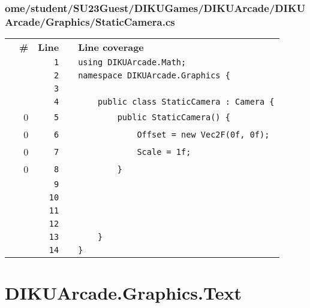 \documentclass[a4paper,landscape,10pt]{article}
\begin{document}
\subsubsection{ome/student/SU23Guest/DIKUGames/DIKUArcade/DIKUArcade/Graphics/StaticCamera.cs}
\begin{longtable}[l]{lrrll}
\textbf{} & \textbf{\#} & \textbf{Line} & \textbf{} & \textbf{Line coverage}\\
\cellcolor{gray} &  & \verb~1~ & & \verb~using DIKUArcade.Math;~\\
\cellcolor{gray} &  & \verb~2~ & & \verb~namespace DIKUArcade.Graphics {~\\
\cellcolor{gray} &  & \verb~3~ & & \verb~~\\
\cellcolor{gray} &  & \verb~4~ & & \verb~    public class StaticCamera : Camera {~\\
\cellcolor{red} & 0 & \verb~5~ & & \verb~        public StaticCamera() {~\\
\cellcolor{red} & 0 & \verb~6~ & & \verb~            Offset = new Vec2F(0f, 0f);~\\
\cellcolor{red} & 0 & \verb~7~ & & \verb~            Scale = 1f;~\\
\cellcolor{red} & 0 & \verb~8~ & & \verb~        }~\\
\cellcolor{gray} &  & \verb~9~ & & \verb~~\\
\cellcolor{gray} &  & \verb~10~ & & \verb~~\\
\cellcolor{gray} &  & \verb~11~ & & \verb~~\\
\cellcolor{gray} &  & \verb~12~ & & \verb~~\\
\cellcolor{gray} &  & \verb~13~ & & \verb~    }~\\
\cellcolor{gray} &  & \verb~14~ & & \verb~}~\\
\end{longtable}
\newpage
\section{DIKUArcade.Graphics.Text}
\end{document}
